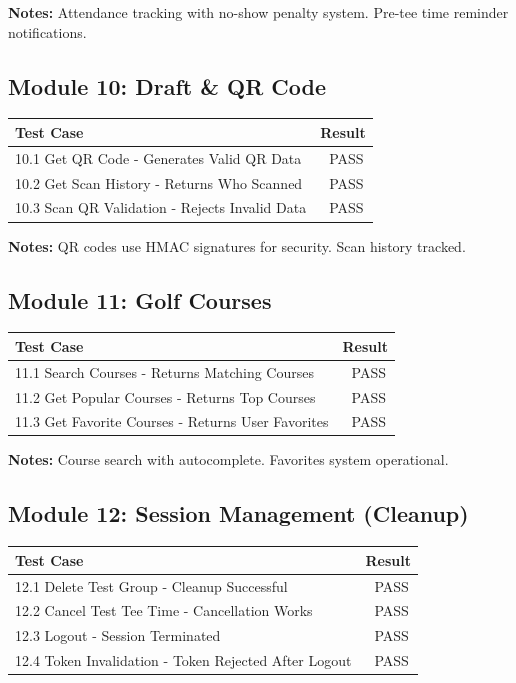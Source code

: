 \documentclass[11pt,a4paper]{article}
\newcommand{\pass}{\textcolor{pass}{\checkmark\ PASS}}
\begin{document}
\vspace{0.5cm}
\textbf{Notes:} Attendance tracking with no-show penalty system. Pre-tee time reminder notifications.

\subsection{Module 10: Draft \& QR Code}

\begin{tabular}{|p{10cm}|c|}
\hline
\textbf{Test Case} & \textbf{Result} \\
\hline
10.1 Get QR Code - Generates Valid QR Data & \pass \\
\hline
10.2 Get Scan History - Returns Who Scanned & \pass \\
\hline
10.3 Scan QR Validation - Rejects Invalid Data & \pass \\
\hline
\end{tabular}

\vspace{0.5cm}
\textbf{Notes:} QR codes use HMAC signatures for security. Scan history tracked.

\subsection{Module 11: Golf Courses}

\begin{tabular}{|p{10cm}|c|}
\hline
\textbf{Test Case} & \textbf{Result} \\
\hline
11.1 Search Courses - Returns Matching Courses & \pass \\
\hline
11.2 Get Popular Courses - Returns Top Courses & \pass \\
\hline
11.3 Get Favorite Courses - Returns User Favorites & \pass \\
\hline
\end{tabular}

\vspace{0.5cm}
\textbf{Notes:} Course search with autocomplete. Favorites system operational.

\subsection{Module 12: Session Management (Cleanup)}

\begin{tabular}{|p{10cm}|c|}
\hline
\textbf{Test Case} & \textbf{Result} \\
\hline
12.1 Delete Test Group - Cleanup Successful & \pass \\
\hline
12.2 Cancel Test Tee Time - Cancellation Works & \pass \\
\hline
12.3 Logout - Session Terminated & \pass \\
\hline
12.4 Token Invalidation - Token Rejected After Logout & \pass \\
\hline
\end{tabular}
\end{document}
